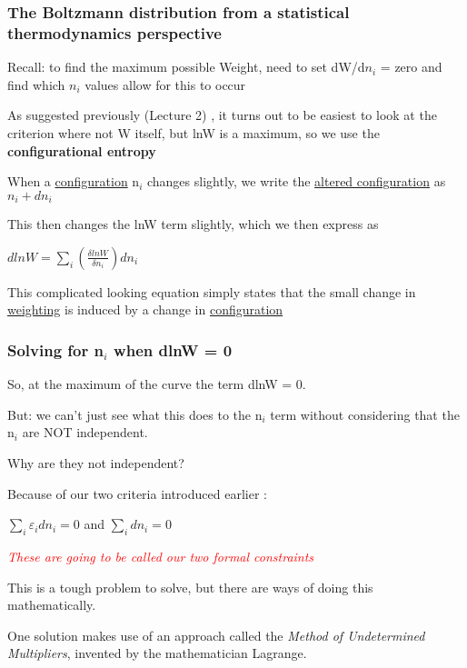 \documentclass[a4paper,12pt,titlepage]{article}
\begin{document}
\begin{frame}[allowframebreaks]
\frametitle{The Boltzmann distribution from a statistical thermodynamics perspective}
Recall: to find the maximum possible Weight, need to set dW/d\(n_i\) = zero and find which \(n_i\) values allow for this to occur\smallskip

As suggested previously (Lecture 2) , it turns out to be easiest to look at the criterion where not W itself, but lnW is a maximum, so we use the \textbf{configurational entropy}\smallskip

When a \underline{configuration} n\(_i\) changes slightly, we write the \underline{altered configuration} as \(n_i + dn_i\)\smallskip
 
This then changes the lnW term slightly, which we then express as 
\begin{center}
\(dlnW  = \sum_i \left( \frac{\delta lnW}{\delta n_i}\right)  dn_i\) \hspace{1in} 
\end{center}

This complicated looking equation simply states that the small change in \underline{weighting} is induced by a change in \underline{configuration}
\end{frame}

\begin{frame}[allowframebreaks]
\frametitle{Solving for n\(_i\) when dlnW = 0}
So, at the maximum of the curve the term dlnW  = 0.

But: we can't just see what this does to the n\(_i\) term without considering that the n\(_i\) are NOT independent. 
 
Why are they not independent?
 
Because of our two criteria introduced earlier :

\medskip
\(\sum_i \varepsilon_i  dn_i  =    0            	\)\newline\smallskip
and\newline\smallskip
\(\sum_i dn_i  =    0            	\)\newline

\textit{\textcolor{red}{These are going to be called our two formal constraints}}
 
This is a tough problem to solve, but there are ways of doing this mathematically. 
 
One solution makes use of an approach called the \textit{Method of Undetermined Multipliers}, invented by the mathematician Lagrange.
\end{frame}
\end{document}
